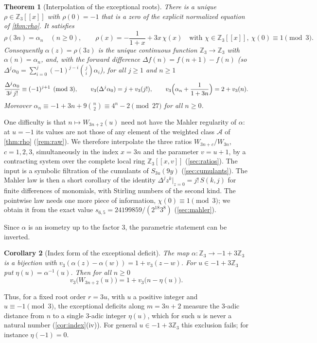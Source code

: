 \documentclass[11pt,reqno]{amsart}
\theoremstyle{definition}
\theoremstyle{remark}
\theoremstyle{plain}
\newtheorem{mainthm}{Theorem}
\newtheorem{maincor}[mainthm]{Corollary}
\newcommand{\Z}{\mathbb Z}
\newcommand{\cA}{\mathcal A}
\begin{document}
\begin{mainthm}[Interpolation of the exceptional roots]\label{thmB}
There is a unique $\rho\in\Z_3[[x]]$ with $\rho(0)=-1$ that is a zero of the explicit normalized equation of \cref{thm:rho}. It satisfies
\[
\rho(3n)=\alpha_n\quad(n\ge0),\qquad \rho(x)=-\frac1{1+x}+3x\,\chi(x)\quad\text{with }\chi\in\Z_3[[x]],\ \chi(0)\equiv1\pmod 3 .
\]
Consequently $\alpha(z)=\rho(3z)$ is the unique continuous function $\Z_3\to\Z_3$ with $\alpha(n)=\alpha_n$, and, with the forward difference $\Delta f(n)=f(n+1)-f(n)$ (so $\Delta^j\alpha_0=\sum_{i=0}^j(-1)^{j-i}\binom ji\alpha_i$), for all $j\ge1$ and $n\ge1$
\[
\frac{\Delta^j\alpha_0}{3^j\,j!}\equiv(-1)^{j+1}\pmod 3,\qquad v_3(\Delta^j\alpha_0)=j+v_3(j!),\qquad
v_3\Bigl(\alpha_n+\frac1{1+3n}\Bigr)=2+v_3(n).
\]
Moreover $\alpha_n\equiv-1+3n+9\binom n2\equiv4^n-2\pmod{27}$ for all $n\ge0$.
\end{mainthm}

One difficulty is that $n\mapsto W_{3n+2}(u)$ need not have the Mahler regularity of $\alpha$: at $u=-1$ its values are not those of any element of the weighted class $\cA$ of \cref{thm:rho} (\cref{rem:raw}). We therefore interpolate the three ratios $W_{3n+c}/W_{3n}$, $c=1,2,3$, simultaneously in the index $x=3n$ and the parameter $v=u+1$, by a contracting system over the complete local ring $\Z_3[[x,v]]$ (\cref{sec:ratios}). The input is a symbolic filtration of the cumulants of $S_{3u}(9y)$ (\cref{sec:cumulants}). The Mahler law is then a short corollary of the identity $\Delta^jz^k|_{z=0}=j!\,S(k,j)$ for finite differences of monomials, with Stirling numbers of the second kind. The pointwise law needs one more piece of information, $\chi(0)\equiv1\pmod 3$; we obtain it from the exact value $s_{6,5}=24199859/(2^{18}3^8)$ (\cref{sec:mahler}).

Since $\alpha$ is an isometry up to the factor $3$, the parametric statement can be inverted.

\begin{maincor}[Index form of the exceptional deficit]\label{corC}
The map $\alpha\colon\Z_3\to-1+3\Z_3$ is a bijection with $v_3(\alpha(z)-\alpha(w))=1+v_3(z-w)$. For $u\in-1+3\Z_3$ put $\eta(u)=\alpha^{-1}(u)$. Then for all $n\ge0$
\[
v_3\bigl(W_{3n+2}(u)\bigr)=1+v_3\bigl(n-\eta(u)\bigr).
\]
\end{maincor}

Thus, for a fixed root order $r=3u$, with $u$ a positive integer and $u\equiv-1\pmod3$, the exceptional deficits along $m=3n+2$ measure the $3$-adic distance from $n$ to a single $3$-adic integer $\eta(u)$, which for such $u$ is never a natural number (\cref{cor:index}(iv)). For general $u\in-1+3\Z_3$ this exclusion fails; for instance $\eta(-1)=0$.
\end{document}
